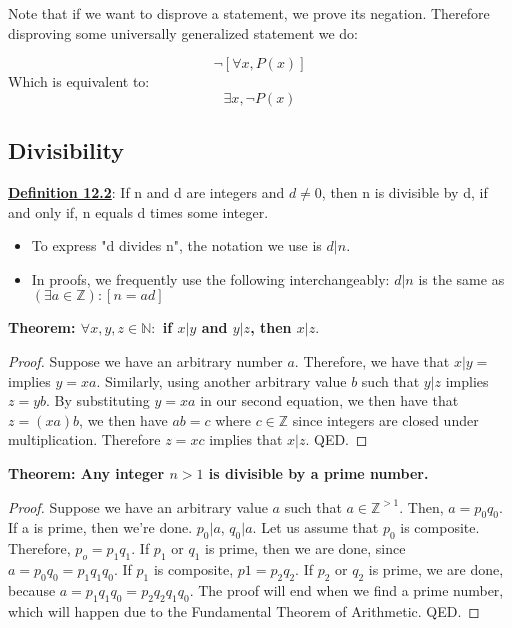 Note that if we want to disprove a statement, we prove its negation. Therefore disproving some universally generalized statement we do:

\begin{center} 
\begin{displaymath}
    \neg[\forall x, P(x)]
\end{displaymath}
Which is equivalent to:
\begin{displaymath}
    \exists x, \neg P(x)
\end{displaymath}
\end{center}

\subsection{Divisibility}
\textbf{\underline{Definition 12.2}}: If n and d are integers and $d \neq 0$, then n is divisible by d, if and only if, n equals d times some integer.

\begin{itemize}
    \item To express "d divides n", the notation we use is $d|n$.
    \item In proofs, we frequently use the following interchangeably: $d|n$ is the same as $(\exists a \in \mathbb{Z}) : [n = ad]$
\end{itemize}

\begin{example}
    \textbf{Theorem: $\forall x, y, z \in \mathbb{N} : $ if $x|y$ and $y|z$, then $x|z$}.
\end{example}

\begin{proof}
    Suppose we have an arbitrary number $a$. Therefore, we have that $x|y=$ implies $y=xa$. Similarly, using another arbitrary value $b$ such that $y|z$ implies $z=yb$. By substituting $y=xa$ in our second equation, we then have that $z=(xa)b$, we then have $ab=c$ where $c \in \mathbb{Z}$ since integers are closed under multiplication. Therefore $z=xc$ implies that $x|z$. QED.
\end{proof}

\begin{example}
    \textbf{Theorem: Any integer $n>1$ is divisible by a prime number.}
\end{example}

\begin{proof}
    Suppose we have an arbitrary value $a$ such that $a \in \mathbb{Z}^{>1}$. Then, $a=p_0q_0$. If a is prime, then we're done. $p_0|a$, $q_0|a$. Let us assume that $p_0$ is composite. Therefore, $p_o=p_1q_1$. If $p_1$ or $q_1$ is prime, then we are done, since $a=p_0q_0=p_1q_1q_0$. If $p_1$ is composite, $p1=p_2q_2$. If $p_2$ or $q_2$ is prime, we are done, because $a=p_1q_1q_0=p_2q_2q_1q_0$. The proof will end when we find a prime number, which will happen due to the Fundamental Theorem of Arithmetic. QED.
\end{proof}

